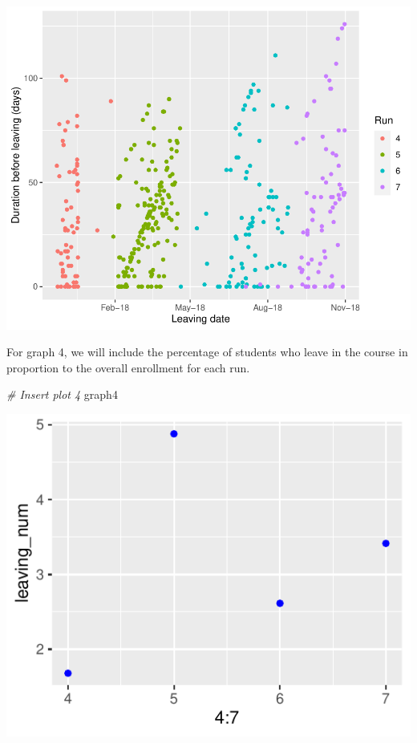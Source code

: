 \documentclass[12pt,]{article}
\newenvironment{Shaded}{\begin{snugshade}}{\end{snugshade}}
\newcommand{\CommentTok}[1]{\textcolor[rgb]{0.56,0.35,0.01}{\textit{#1}}}
\newcommand{\NormalTok}[1]{#1}
\begin{document}
\begin{center}\includegraphics{report_files/figure-latex/unnamed-chunk-20-1} \end{center}

For graph 4, we will include the percentage of students who leave in the
course in proportion to the overall enrollment for each run.

\begin{Shaded}
\begin{Highlighting}[]
\CommentTok{\# Insert plot 4}
\NormalTok{graph4}
\end{Highlighting}
\end{Shaded}

\begin{center}\includegraphics{report_files/figure-latex/unnamed-chunk-21-1} \end{center}
\end{document}

